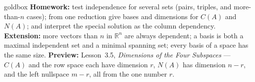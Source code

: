 \documentclass[10pt]{article}
\begin{document}
\begin{skillbox}{goldbox}
\textbf{Homework:} test independence for several sets (pairs, triples, and more-than-$n$ cases); from one
reduction give bases and dimensions for $C(A)$ and $N(A)$; and interpret the special solution as the
column dependency. \textbf{Extension:} more vectors than $n$ in $\mathbb{R}^n$ are always dependent; a
basis is both a maximal independent set and a minimal spanning set; every basis of a space has the same
size. \textbf{Preview:} Lesson~3.5, \emph{Dimensions of the Four Subspaces} --- $C(A)$ and the row space
each have dimension $r$, $N(A)$ has dimension $n-r$, and the left nullspace $m-r$, all from the one number
$r$.
\end{skillbox}
\end{document}
